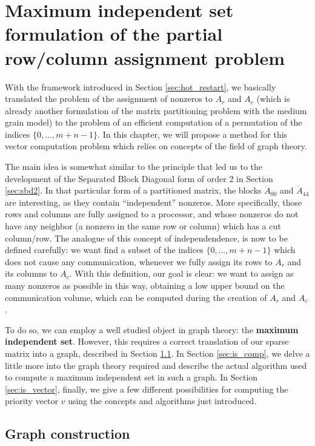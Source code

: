 \chapter{Maximum independent set formulation of the partial row/column assignment problem} \label{chap:independent_set}

With the framework introduced in Section \ref{sec:hot_restart}, we basically translated the problem of the assignment of nonzeros to $A_r$ and $A_c$ (which is already another formulation of the matrix partitioning problem with the medium grain model) to the problem of an efficient computation of a permutation of the indices $\{0,\dots,m+n-1\}$. In this chapter, we will propose a method for this vector computation problem which relies on concepts of the field of graph theory.

The main idea is somewhat similar to the principle that led us to the development of the Separated Block Diagonal form of order 2 in Section \ref{sec:sbd2}. In that particular form of a partitioned matrix, the blocks $\ddot{A}_{00}$ and $\ddot{A}_{44}$ are interesting, as they contain ``independent'' nonzeros. More specifically, those rows and columns are fully assigned to a processor, and whose nonzeros do not have any neighbor (a nonzero in the same row or column) which has a cut column/row. The analogue of this concept of independendence, is now to be defined carefully: we want find a subset of the indices $\{0,\dots,m+n-1\}$ which does not cause any communication, whenever we fully assign its rows to $A_r$ and its columns to $A_c$. With this definition, our goal is clear: we want to assign as many nonzeros as possible in this way, obtaining a low upper bound on the communication volume, which can be computed during the creation of $A_r$ and $A_c$.

To do so, we can employ a well studied object in graph theory: the \textbf{maximum independent set}. However, this requires a correct translation of our sparse matrix into a graph, described in Section \ref{sec:is_graph}. In Section \ref{sec:is_comp}, we delve a little more into the graph theory required and describe the actual algorithm used to compute a maximum independent set in such a graph. In Section \ref{sec:is_vector}, finally, we give a few different possibilities for computing the priority vector $v$ using the concepts and algorithms just introduced.

\section{Graph construction} \label{sec:is_graph}

